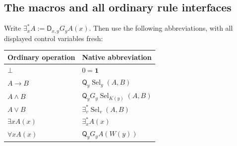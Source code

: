 \documentclass[11pt,letterpaper]{article}
\theoremstyle{definition}\newtheorem{definition}[theorem]{Definition}
\theoremstyle{remark}\newtheorem{remark}[theorem]{Remark}
\newcommand{\DD}{\mathsf D}
\newcommand{\QQ}{\mathsf Q}
\newcommand{\one}{\mathbf1}
\begin{document}
\subsection{The macros and all ordinary rule interfaces}
Write $\exists^*_xA:=\DD_{x,y}G_yA(x)$. Then use the following
abbreviations, with all displayed control variables fresh:
\begin{center}
\begin{tabularx}{\linewidth}{@{}lX@{}}
\toprule
Ordinary operation & Native abbreviation\\\midrule
$\bot$ & $0=\one$\\
$A\to B$ & $\QQ_y\operatorname{Sel}_y(A,B)$\\
$A\land B$ & $\QQ_yG_y\operatorname{Sel}_{K(y)}(A,B)$\\
$A\lor B$ & $\exists^*_v\operatorname{Sel}_v(A,B)$\\
$\exists xA(x)$ & $\exists^*_xA(x)$\\
$\forall xA(x)$ & $\QQ_yG_yA(W(y))$\\\bottomrule
\end{tabularx}
\end{center}
\end{document}
